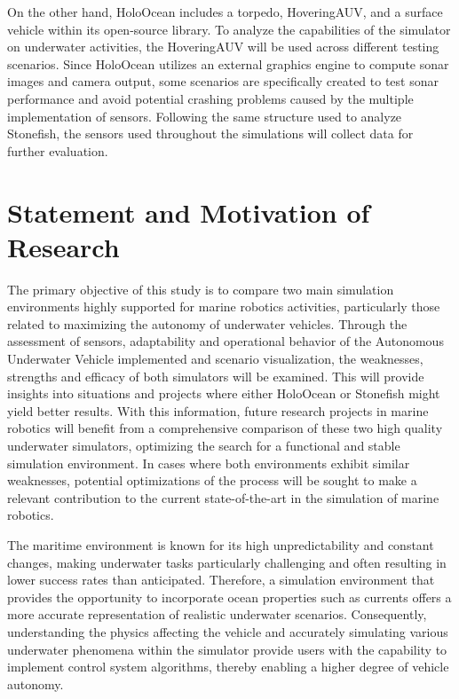 \documentclass[]{article}
\begin{document}
	On the other hand, HoloOcean includes a torpedo, HoveringAUV, and a surface vehicle within its open-source library. To analyze the capabilities of the simulator on underwater activities, the HoveringAUV will be used across different testing scenarios. Since HoloOcean utilizes an external graphics engine to compute sonar images and camera output, some scenarios are specifically created to test sonar performance and avoid potential crashing problems caused by the multiple implementation of sensors. Following the same structure used to analyze Stonefish, the sensors used throughout the simulations will collect data for further evaluation.

 	\setlength{\skip\footins}{0cm}
	\newpage
	
	\section{Statement and Motivation of Research}
	
	
	The primary objective of this study is to compare two main simulation environments highly supported for marine robotics activities, particularly those related to maximizing the autonomy of underwater vehicles. Through the assessment of sensors, adaptability and operational behavior of the Autonomous Underwater Vehicle implemented and scenario visualization, the weaknesses, strengths and efficacy of both simulators will be examined. This will provide insights into situations and projects where either HoloOcean or Stonefish might yield better results. With this information, future research projects in marine robotics will benefit from a comprehensive comparison of these two high quality underwater simulators, optimizing the search for a functional and stable simulation environment. In cases where both environments exhibit similar weaknesses, potential optimizations of the process will be sought to make a relevant contribution to the current state-of-the-art in the simulation of marine robotics.
	
	The maritime environment is known for its high unpredictability and constant changes, making underwater tasks particularly challenging and often resulting in lower success rates than anticipated. Therefore, a simulation environment that provides the opportunity to incorporate ocean properties such as currents offers a more accurate representation of realistic underwater scenarios. Consequently, understanding the physics affecting the vehicle and accurately simulating various underwater phenomena within the simulator provide users with the capability to implement control system algorithms, thereby enabling a higher degree of vehicle autonomy.
	
\end{document}
